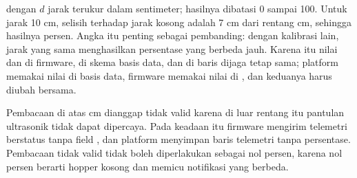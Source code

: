 \begin{center}
\PctFormula
\end{center}

dengan $d$ jarak terukur dalam sentimeter; hasilnya dibatasi 0 sampai 100. Untuk
jarak 10 cm, selisih terhadap jarak kosong adalah 7 cm dari rentang \HopperSpan{}
cm, sehingga hasilnya \PctAtTenCm{} persen. Angka itu penting sebagai pembanding:
dengan kalibrasi lain, jarak yang sama menghasilkan persentase yang berbeda jauh.
Karena itu nilai \HopperFull{} dan \HopperEmpty{} di firmware, di skema basis data,
dan di baris  dijaga tetap sama; platform memakai nilai di basis data,
firmware memakai nilai di , dan keduanya harus diubah bersama.

Pembacaan di atas \MaxDistance{} cm dianggap tidak valid karena di luar rentang itu
pantulan ultrasonik tidak dapat dipercaya. Pada keadaan itu firmware mengirim
telemetri berstatus  tanpa field , dan platform
menyimpan baris telemetri tanpa persentase. Pembacaan tidak valid tidak boleh
diperlakukan sebagai nol persen, karena nol persen berarti hopper kosong dan memicu
notifikasi yang berbeda.

